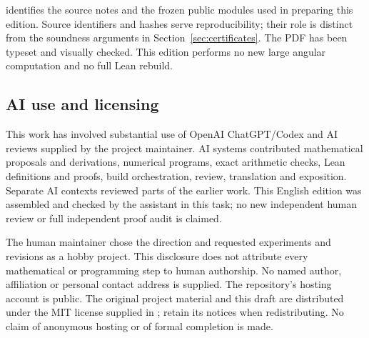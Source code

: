  identifies the source notes and the frozen
public modules used in preparing this edition. Source identifiers
and hashes serve reproducibility; their role is distinct from the
soundness arguments in Section~\ref{sec:certificates}.
The PDF has been typeset and visually checked. This edition performs
no new large angular computation and no full Lean rebuild.

\subsection{AI use and licensing}
This work has involved substantial use of OpenAI ChatGPT/Codex and
AI reviews supplied by the project maintainer. AI systems contributed
mathematical proposals and derivations, numerical programs, exact
arithmetic checks, Lean definitions and proofs, build orchestration,
review, translation and exposition. Separate AI contexts reviewed
parts of the earlier work. This English edition was assembled and
checked by the assistant in this task; no new independent human
review or full independent proof audit is claimed.

The human maintainer chose the direction and requested experiments
and revisions as a hobby project. This disclosure does not attribute
every mathematical or programming step to human authorship. No named
author, affiliation or personal contact address is supplied. The
repository's hosting account is public. The original project material
and this draft are distributed under the MIT license supplied in
; retain its notices when redistributing. No claim of
anonymous hosting or of formal completion is made.

